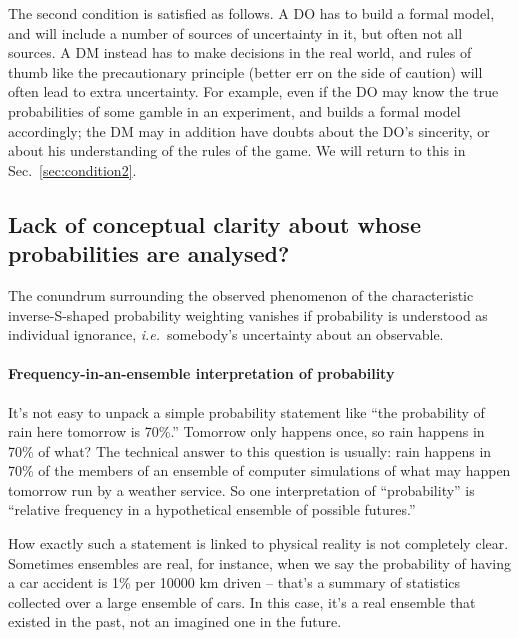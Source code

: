 \documentclass[a4paper, 12pt]{article}
\newcommand{\seclabel}[1]{\label{sec:#1}}
\newcommand{\secref}[1]{Sec.~\ref{sec:#1}}
\newcommand{\ie}{{\it i.e.}\ }
\newcommand{\eg}{{\it e.g.}\ }
\begin{document}
The second condition is satisfied as follows. A DO has to build a formal model, and will include a number of sources of uncertainty in it, but often not all sources. A DM instead has to make decisions in the real world, and rules of thumb like the precautionary principle (better err on the side of caution) will often lead to extra uncertainty. For example, even if the DO may know the true probabilities of some gamble in an experiment, and builds a formal model accordingly; the DM may in addition have doubts about the DO's sincerity, or about his understanding of the rules of the game. We will return to this in \secref{condition2}.

\subsection{Lack of conceptual clarity about whose probabilities are analysed?} \seclabel{tricky}

The conundrum surrounding the observed phenomenon of the characteristic inverse-S-shaped probability weighting vanishes if probability is understood as individual ignorance, \ie somebody's uncertainty about an observable.

\paragraph{Frequency-in-an-ensemble interpretation of probability}
It's not easy to unpack a simple probability statement like ``the probability of rain here tomorrow is 70\%.'' Tomorrow only happens once, so rain happens in 70\% of what? The technical answer to this question is usually: rain happens in 70\% of the members of an ensemble of computer simulations of what may happen tomorrow run by a weather service. So one interpretation of ``probability'' is ``relative frequency in a hypothetical ensemble of possible futures.'' 

How exactly such a statement is linked to physical reality is not completely clear. Sometimes ensembles are real, for instance, when we say the probability of having a car accident is 1\% per 10000 km driven -- that's a summary of statistics collected over a large ensemble of cars. In this case, it's a real ensemble that existed in the past, not an imagined one in the future. 
\end{document}
